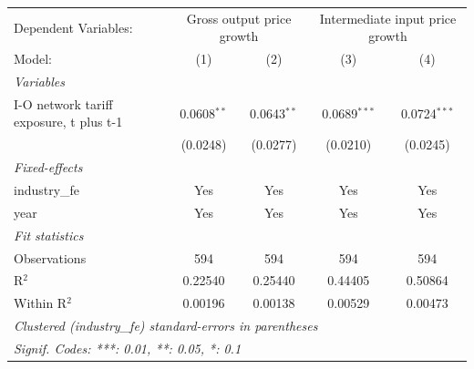 \begingroup
\centering
\begin{tabular}{lcccc}
   \tabularnewline \midrule \midrule
   Dependent Variables: & \multicolumn{2}{c}{Gross output price growth} & \multicolumn{2}{c}{Intermediate input price growth}\\
   Model:                                  & (1)           & (2)           & (3)            & (4)\\  
   \midrule
   \emph{Variables}\\
   I-O network tariff exposure, t plus t-1 & 0.0608$^{**}$ & 0.0643$^{**}$ & 0.0689$^{***}$ & 0.0724$^{***}$\\   
                                           & (0.0248)      & (0.0277)      & (0.0210)       & (0.0245)\\   
   \midrule
   \emph{Fixed-effects}\\
   industry\_fe                            & Yes           & Yes           & Yes            & Yes\\  
   year                                    & Yes           & Yes           & Yes            & Yes\\  
   \midrule
   \emph{Fit statistics}\\
   Observations                            & 594           & 594           & 594            & 594\\  
   R$^2$                                   & 0.22540       & 0.25440       & 0.44405        & 0.50864\\  
   Within R$^2$                            & 0.00196       & 0.00138       & 0.00529        & 0.00473\\  
   \midrule \midrule
   \multicolumn{5}{l}{\emph{Clustered (industry\_fe) standard-errors in parentheses}}\\
   \multicolumn{5}{l}{\emph{Signif. Codes: ***: 0.01, **: 0.05, *: 0.1}}\\
\end{tabular}
\par\endgroup
